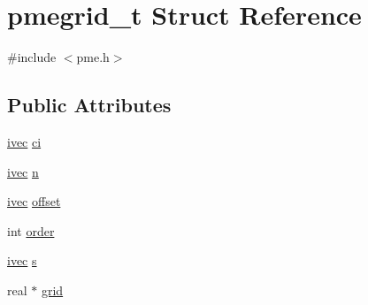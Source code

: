 \hypertarget{structpmegrid__t}{\section{pmegrid\-\_\-t \-Struct \-Reference}
\label{structpmegrid__t}
}


{\ttfamily \#include $<$pme.\-h$>$}

\subsection*{\-Public \-Attributes}
\begin{DoxyCompactItemize}
\item 
\hyperlink{share_2template_2gromacs_2types_2simple_8h_a74f6ffdb4a9c1764f5293969d8c681b6}{ivec} \hyperlink{structpmegrid__t_a0b808912a1ad3e4682c7d47aa85c1224}{ci}
\item 
\hyperlink{share_2template_2gromacs_2types_2simple_8h_a74f6ffdb4a9c1764f5293969d8c681b6}{ivec} \hyperlink{structpmegrid__t_a4ce588917c738cfb101a288d65583ad3}{n}
\item 
\hyperlink{share_2template_2gromacs_2types_2simple_8h_a74f6ffdb4a9c1764f5293969d8c681b6}{ivec} \hyperlink{structpmegrid__t_a69d1480529b3727029021dea1159ace6}{offset}
\item 
int \hyperlink{structpmegrid__t_ac3cc87337dfb98aa2936cbad992c2a06}{order}
\item 
\hyperlink{share_2template_2gromacs_2types_2simple_8h_a74f6ffdb4a9c1764f5293969d8c681b6}{ivec} \hyperlink{structpmegrid__t_a7f3838cb05afabb4c2b2f247a17b120e}{s}
\item 
real $\ast$ \hyperlink{structpmegrid__t_ac27d10b1fb24474516d0c214a535edfa}{grid}
\end{DoxyCompactItemize}


